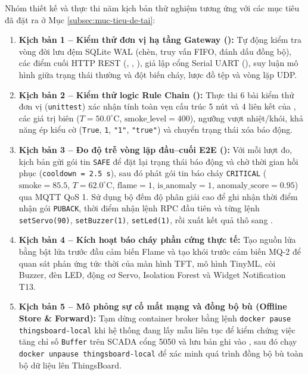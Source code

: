 Nhóm thiết kế và thực thi năm kịch bản thử nghiệm tương ứng với các mục tiêu đã đặt ra ở Mục \ref{subsec:muc-tieu-de-tai}:
\begin{enumerate}[leftmargin=*, itemsep=2pt]
  \item \textbf{Kịch bản 1 -- Kiểm thử đơn vị hạ tầng Gateway ():} Tự động kiểm tra vòng đời lưu đệm SQLite WAL (chèn, truy vấn FIFO, đánh dấu đồng bộ), các điểm cuối HTTP REST (, , ), giả lập cổng Serial UART (), suy luận mô hình  giữa trạng thái thường và đột biến cháy, lược đồ tệp  và vòng lặp UDP.
  \item \textbf{Kịch bản 2 -- Kiểm thử logic Rule Chain ():} Thực thi 6 bài kiểm thử đơn vị (\texttt{unittest}) xác nhận tính toàn vẹn cấu trúc 5 nút và 4 liên kết của , các giá trị biên ($T = 50.0^\circ\text{C}$, $\text{smoke\_level} = 400$), ngưỡng vượt nhiệt/khói, khả năng ép kiểu cờ  (\texttt{True}, \texttt{1}, \texttt{"1"}, \texttt{"true"}) và chuyển trạng thái xóa báo động.
  \item \textbf{Kịch bản 3 -- Đo độ trễ vòng lặp đầu--cuối E2E ():} Với mỗi lượt đo, kịch bản gửi gói tin \texttt{SAFE} để đặt lại trạng thái báo động và chờ thời gian hồi phục (\texttt{cooldown = 2.5 s}), sau đó phát gói tin báo cháy \texttt{CRITICAL} ($\text{smoke} = 85.5$, $T = 62.0^\circ\text{C}$, $\text{flame} = 1$, $\text{is\_anomaly} = 1$, $\text{anomaly\_score} = 0.95$) qua MQTT QoS 1. Sử dụng bộ đếm độ phân giải cao  để ghi nhận thời điểm nhận gói \texttt{PUBACK}, thời điểm nhận lệnh RPC đầu tiên và từng lệnh \texttt{setServo(90)}, \texttt{setBuzzer(1)}, \texttt{setLed(1)}, rồi xuất kết quả thô sang .
  \item \textbf{Kịch bản 4 -- Kích hoạt báo cháy phần cứng thực tế:} Tạo nguồn lửa bằng bật lửa trước đầu cảm biến Flame và tạo khói trước cảm biến MQ-2 để quan sát phản ứng tức thời của màn hình TFT, mô hình TinyML, còi Buzzer, đèn LED, động cơ Servo, Isolation Forest và Widget Notification T13.
  \item \textbf{Kịch bản 5 -- Mô phỏng sự cố mất mạng và đồng bộ bù (Offline Store \& Forward):} Tạm dừng container broker bằng lệnh \texttt{docker pause thingsboard-local} khi hệ thống đang lấy mẫu liên tục để kiểm chứng việc tăng chỉ số \texttt{Buffer} trên SCADA cổng 5050 và lưu bản ghi vào , sau đó chạy \texttt{docker unpause thingsboard-local} để xác minh quá trình đồng bộ bù toàn bộ dữ liệu lên ThingsBoard.
\end{enumerate}

